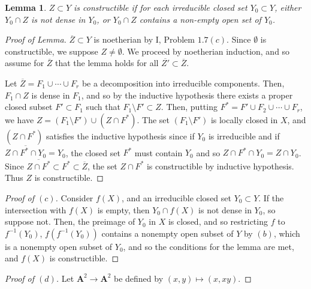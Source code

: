 \documentclass[12pt,letterpaper]{article}
\newtheorem{lemma}{Lemma}
\theoremstyle{definition}
\theoremstyle{remark}
\numberwithin{equation}{section}
\numberwithin{figure}{problem}
\begin{document}
\begin{lemma}
  $Z \subset Y$ is constructible if for each irreducible closed set $Y_0 \subset Y$, either $Y_0 \cap Z$ is not dense in $Y_0$, or $Y_0 \cap Z$ contains a non-empty open set of $Y_0$.
\end{lemma}
\begin{proof}[Proof of Lemma]
  $\overline{Z} \subset Y$ is noetherian by I, Problem $1.7(c)$. Since $\emptyset$ is constructible, we suppose $Z \ne \emptyset$. We proceed by noetherian induction, and so assume for $\overline{Z}$ that the lemma holds for all $\overline{Z'} \subset \overline{Z}$.
  \par Let $\overline{Z} = F_1 \cup \cdots \cup F_r$ be a decomposition into irreducible components. Then, $F_1 \cap Z$ is dense in $F_1$, and so by the inductive hypothesis there exists a proper closed subset $F' \subset F_1$ such that $F_1 \setminus F' \subset Z$. Then, putting $F^* = F' \cup F_2 \cup \cdots \cup F_r$, we have $Z = (F_1 \setminus F') \cup (Z \cap F^*)$. The set $(F_1 \setminus F')$ is locally closed in $X$, and $(Z \cap F^*)$ satisfies the inductive hypothesis since if $Y_0$ is irreducible and if $\overline{Z \cap F^* \cap Y_0} = Y_0$, the closed set $F^*$ must contain $Y_0$ and so $Z \cap F^* \cap Y_0 = Z \cap Y_0$. Since $\overline{Z \cap F^*} \subset F^* \subset \overline{Z}$, the set $Z \cap F^*$ is constructible by inductive hypothesis. Thus $Z$ is constructible.
\end{proof}
\begin{proof}[Proof of $(c)$]
  Consider $f(X)$, and an irreducible closed set $Y_0 \subset Y$. If the intersection with $f(X)$ is empty, then $Y_0 \cap f(X)$ is not dense in $Y_0$, so suppose not. Then, the preimage of $Y_0$ in $X$ is closed, and so restricting $f$ to $f^{-1}(Y_0)$, $f(f^{-1}(Y_0))$ contains a nonempty open subset of $Y$ by $(b)$, which is a nonempty open subset of $Y_0$, and so the conditions for the lemma are met, and $f(X)$ is constructible.
\end{proof}
\begin{proof}[Proof of $(d)$]
  Let $\mathbf{A}^2 \to \mathbf{A}^2$ be defined by $(x,y) \mapsto (x,xy)$.
\end{proof}
\end{document}
